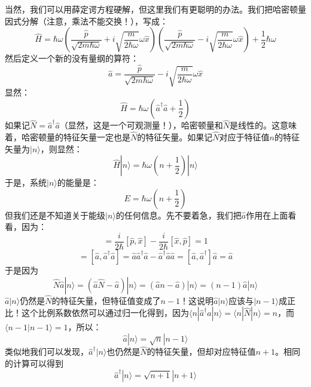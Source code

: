 \documentclass{ctexart}
\begin{document}
当然，我们可以用薛定谔方程硬解，但这里我们有更聪明的办法。我们把哈密顿量因式分解（注意，乘法不能交换！），写成：
\begin{equation}
\hat{H}=\hbar\omega(\frac{\hat{p}}{\sqrt{2m\hbar\omega}}+i\sqrt{\frac{m}{2\hbar\omega}}\omega\hat{x})(\frac{\hat{p}}{\sqrt{2m\hbar\omega}}-i\sqrt{\frac{m}{2\hbar\omega}}\omega\hat{x})+\frac{1}{2}\hbar\omega
\end{equation}
然后定义一个新的没有量纲的算符：
\begin{equation}
\hat{a}=\frac{\hat{p}}{\sqrt{2m\hbar\omega}}-i\sqrt{\frac{m}{2\hbar\omega}}\omega\hat{x}
\end{equation}
显然：
\begin{equation}
\hat{H}=\hbar\omega\left(\hat{a}^\dagger\hat{a}+\frac{1}{2}\right)
\end{equation}
如果记$\hat{N}=\hat{a}^\dagger\hat{a}$（显然，这是一个可观测量！），哈密顿量和$\hat{N}$是线性的。这意味着，哈密顿量的特征矢量一定也是$\hat{N}$的特征矢量。如果记$\hat{N}$对应于特征值$n$的特征矢量为$|n\rangle$，则显然：
\begin{equation}
\hat{H}|n\rangle=\hbar\omega\left(n+\frac{1}{2}\right)|n\rangle
\end{equation}
于是，系统$|n\rangle$的能量是：
\begin{equation}
E=\hbar\omega\left(n+\frac{1}{2}\right)
\end{equation}
但我们还是不知道关于能级$|n\rangle$的任何信息。先不要着急，我们把$\hat{a}$作用在上面看看，因为：
\begin{equation}
[\hat{a},\hat{a}^\dagger]=\frac{i}{2\hbar}[\hat{p},\hat{x}]-\frac{i}{2\hbar}[\hat{x},\hat{p}]=1
\end{equation}
\begin{equation}
[\hat{a},\hat{N}]=[\hat{a},\hat{a}^\dagger\hat{a}]=\hat{a}\hat{a}^\dagger\hat{a}-\hat{a}^\dagger\hat{a}\hat{a}=[\hat{a},\hat{a}^\dagger]\hat{a}=\hat{a}
\end{equation}
于是因为
\begin{equation}
\hat{N}\hat{a}|n\rangle=(\hat{a}\hat{N}-\hat{a})|n\rangle=(\hat{a}n-\hat{a})|n\rangle=(n-1)\hat{a}|n\rangle
\end{equation}
$\hat{a}|n\rangle$仍然是$\hat{N}$的特征矢量，但特征值变成了$n-1$！这说明$\hat{a}|n\rangle$应该与$|n-1\rangle$成正比！这个比例系数依然可以通过归一化得到，因为$\langle n|\hat{a}^\dagger\hat{a}|n\rangle=\langle n|\hat{N}|n\rangle=n$，而$\langle n-1|n-1\rangle=1$，所以：
\begin{equation}
\hat{a}|n\rangle=\sqrt{n}|n-1\rangle
\end{equation}
类似地我们可以发现，$\hat{a}^\dagger|n\rangle$也仍然是$\hat{N}$的特征矢量，但却对应特征值$n+1$。相同的计算可以得到
\begin{equation}
\hat{a}^\dagger|n\rangle=\sqrt{n+1}|n+1\rangle
\end{equation}
\end{document}
